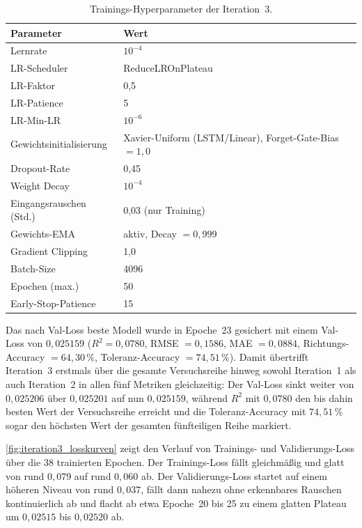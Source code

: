\begin{table}[h]
    \centering
    \caption[Hyperparameter der Iteration 3]{Trainings-Hyperparameter der Iteration~3.}
    \label{tab:iteration3_config}
    \begin{tabular}{ll}
        \toprule
        \textbf{Parameter} & \textbf{Wert} \\
        \midrule
        Lernrate                 & $10^{-4}$ \\
        LR-Scheduler             & ReduceLROnPlateau \\
        LR-Faktor                & 0{,}5 \\
        LR-Patience              & 5 \\
        LR-Min-LR                & $10^{-6}$ \\
        Gewichtsinitialisierung  & Xavier-Uniform (LSTM/Linear), Forget-Gate-Bias $= 1{,}0$ \\
        Dropout-Rate             & 0{,}45 \\
        Weight Decay             & $10^{-4}$ \\
        Eingangsrauschen (Std.)  & 0{,}03 (nur Training) \\
        Gewichts-EMA             & aktiv, Decay $= 0{,}999$ \\
        Gradient Clipping        & 1{,}0 \\
        Batch-Size               & 4096 \\
        Epochen (max.)           & 50 \\
        Early-Stop-Patience      & 15 \\
        \bottomrule
    \end{tabular}
\end{table}

Das nach Val-Loss beste Modell wurde in Epoche~23 gesichert mit einem Val-Loss von $0{,}025159$ ($R^2 = 0{,}0780$, RMSE $= 0{,}1586$, MAE $= 0{,}0884$, Richtungs-Accuracy $= 64{,}30\,\%$, Toleranz-Accuracy $= 74{,}51\,\%$). Damit übertrifft Iteration~3 erstmals über die gesamte Versuchsreihe hinweg sowohl Iteration~1 als auch Iteration~2 in allen fünf Metriken gleichzeitig: Der Val-Loss sinkt weiter von $0{,}025206$ über $0{,}025201$ auf nun $0{,}025159$, während $R^2$ mit $0{,}0780$ den bis dahin besten Wert der Versuchsreihe erreicht und die Toleranz-Accuracy mit $74{,}51\,\%$ sogar den höchsten Wert der gesamten fünfteiligen Reihe markiert.

\autoref{fig:iteration3_losskurven} zeigt den Verlauf von Trainings- und Validierungs-Loss über die 38 trainierten Epochen. Der Trainings-Loss fällt gleichmäßig und glatt von rund $0{,}079$ auf rund $0{,}060$ ab. Der Validierungs-Loss startet auf einem höheren Niveau von rund $0{,}037$, fällt dann nahezu ohne erkennbares Rauschen kontinuierlich ab und flacht ab etwa Epoche~20 bis 25 zu einem glatten Plateau um $0{,}02515$ bis $0{,}02520$ ab.

